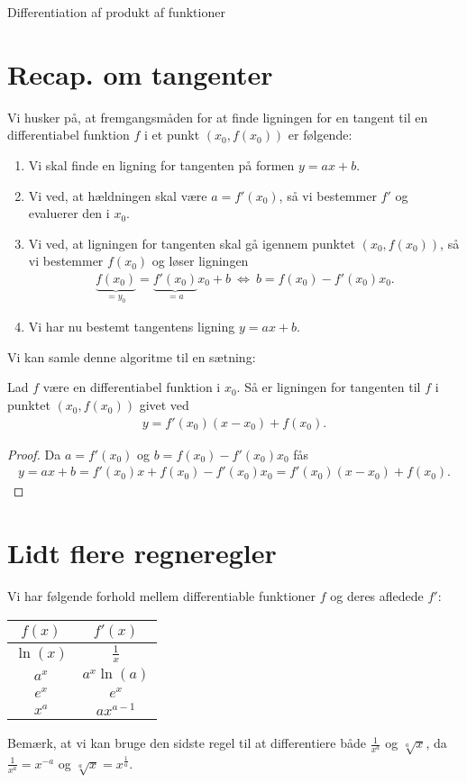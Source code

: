 
\begin{center}
\Huge
Differentiation af produkt af funktioner
\end{center}
\section*{Recap. om tangenter}

Vi husker på, at fremgangsmåden for at finde ligningen for en tangent til en differentiabel funktion $f$ i et punkt $(x_0,f(x_0))$ er følgende:
\begin{enumerate}[label=\roman*)]
\item Vi skal finde en ligning for tangenten på formen $y=ax+b$. 
\item Vi ved, at hældningen skal være $a = f'(x_0)$, så vi bestemmer $f'$ og evaluerer den i $x_0$.
\item Vi ved, at ligningen for tangenten skal gå igennem punktet $(x_0,f(x_0))$, så vi bestemmer $f(x_0)$ og løser ligningen \begin{align*}
\underbrace{f(x_0)}_{=y_0} = \underbrace{f'(x_0)}_{=a}x_0 + b\ \Leftrightarrow\ b = f(x_0) - f'(x_0)x_0.
\end{align*}
\item Vi har nu bestemt tangentens ligning $y = ax + b$.
\end{enumerate}
Vi kan samle denne algoritme til en sætning:
\begin{setn}
Lad $f$ være en differentiabel funktion i $x_0$. Så er ligningen for tangenten til $f$ i punktet $(x_0,f(x_0))$ givet ved
\begin{align*}
y = f'(x_0)(x-x_0) + f(x_0).
\end{align*}
\end{setn}
\begin{proof}
Da $a = f'(x_0)$ og $b =  f(x_0) - f'(x_0)x_0$ fås 
\begin{align*}
y = ax+b = f'(x_0)x + f(x_0)-f'(x_0)x_0 = f'(x_0)(x-x_0) + f(x_0).
\end{align*}
\end{proof}

\section*{Lidt flere regneregler}
\begin{setn}
Vi har følgende forhold mellem differentiable funktioner $f$ og deres afledede $f'$:
\begin{center}
\begin{tabular}{c|c}
$f(x)$ & $f'(x)$\\
\hline
$\ln(x)$ & $\frac{1}{x}$\\
$a^x$ & $a^x\ln(a)$\\
$e^x$ & $e^x$\\
$x^a$ & $ax^{a-1}$
\end{tabular}
\end{center}
\end{setn}
Bemærk, at vi kan bruge den sidste regel til at differentiere både $\frac{1}{x^a}$ og $\sqrt[a]{x}$, da $\frac{1}{x^a} = x^{-a}$ og $\sqrt[a]{x} = x^{\frac{1}{a}}$.
